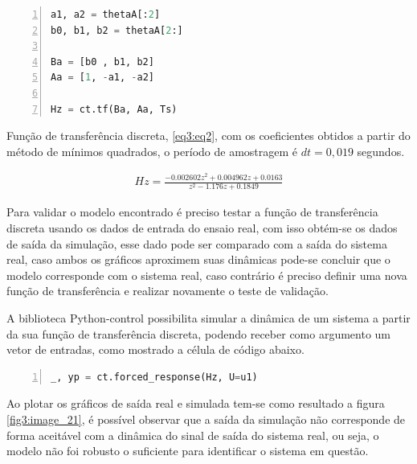 \vspace{0.5cm}

\begin{lstlisting}[language=python, numbers=left, label=py3, caption={Salvando os coeficientes em variáveis e obtendo a função de transferência.}]
a1, a2 = thetaA[:2]
b0, b1, b2 = thetaA[2:]

Ba = [b0 , b1, b2]
Aa = [1, -a1, -a2]

Hz = ct.tf(Ba, Aa, Ts)
\end{lstlisting}

Função de transferência discreta, \ref{eq3:eq2}, com os coeficientes obtidos a partir do método de mínimos quadrados, o período de amostragem é $dt = 0,019$  segundos.

\begin{align}
Hz = \frac{-0.002602 z^2 + 0.004962 z + 0.0163}{z^2 - 1.176 z + 0.1849} \label{eq3:eq2}
\end{align}


Para validar o modelo encontrado é preciso testar a função de transferência discreta usando os dados de entrada do ensaio real, com isso obtém-se os dados de saída da simulação, esse dado pode ser comparado com a saída do sistema real, caso ambos os gráficos aproximem suas dinâmicas pode-se concluir que o modelo corresponde com o sistema real, caso contrário é preciso definir uma nova função de transferência e realizar novamente o teste de validação.

A biblioteca Python-control possibilita simular a dinâmica de um sistema a partir da sua função de transferência discreta, podendo receber como argumento um vetor de entradas, como mostrado a célula de código abaixo.

\vspace{0.5cm}

\begin{lstlisting}[language=python, numbers=left, label=py3, caption={Obtendo a resposta forçada da função de transferência obtida.}]
_, yp = ct.forced_response(Hz, U=u1)
\end{lstlisting}

Ao plotar os gráficos de saída real e simulada tem-se como resultado a figura \ref{fig3:image_21}, é possível observar que a saída da simulação não corresponde de forma aceitável com a dinâmica do sinal de saída do sistema real, ou seja, o modelo não foi robusto o suficiente para identificar o sistema em questão.

